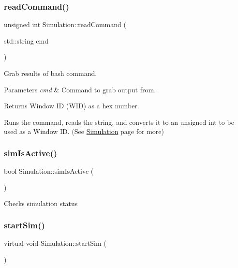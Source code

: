 \subsubsection{\texorpdfstring{readCommand()}{readCommand()}}
{\footnotesize\ttfamily unsigned int Simulation\+::read\+Command (\begin{DoxyParamCaption}\item[{std\+::string}]{cmd }\end{DoxyParamCaption})\hspace{0.3cm}{\ttfamily [inline]}}

Grab results of bash command. 
\begin{DoxyParams}{Parameters}
{\em cmd} & Command to grab output from. \\
\hline
\end{DoxyParams}
\begin{DoxyReturn}{Returns}
Window ID (W\+ID) as a hex number.
\end{DoxyReturn}
Runs the command, reads the string, and converts it to an unsigned int to be used as a Window ID. (See \mbox{\hyperlink{classSimulation}{Simulation}} page for more) \mbox{\label{classSimulation_a0b951a01d3de845823d2a87b0d50adef}} 
\subsubsection{\texorpdfstring{simIsActive()}{simIsActive()}}
{\footnotesize\ttfamily bool Simulation\+::sim\+Is\+Active (\begin{DoxyParamCaption}{ }\end{DoxyParamCaption})\hspace{0.3cm}{\ttfamily [inline]}}

Checks simulation status \mbox{\label{classSimulation_ac523544ffc2b4cffed1d2a6ead5809b1}} 
\subsubsection{\texorpdfstring{startSim()}{startSim()}}
{\footnotesize\ttfamily virtual void Simulation\+::start\+Sim (\begin{DoxyParamCaption}{ }\end{DoxyParamCaption})\hspace{0.3cm}{\ttfamily [pure virtual]}}

